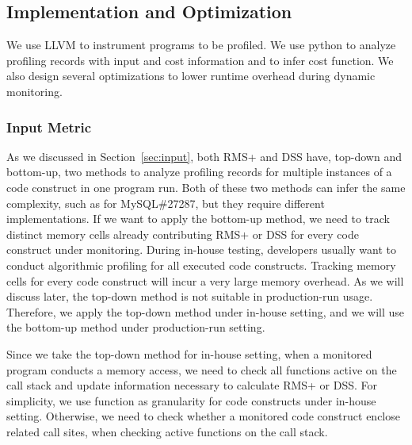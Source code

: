 \subsection{Implementation and Optimization}

We use LLVM\cite{llvm} to instrument programs to be profiled.
We use python to analyze profiling records 
with input and cost information and to infer cost function. 
We also design several optimizations to lower runtime overhead 
during dynamic monitoring.  


\subsubsection{Input Metric}
As we discussed in Section~\ref{sec:input},
both RMS+ and DSS have, top-down and bottom-up, 
two methods to analyze profiling records for multiple instances of 
a code construct in one program run. 
Both of these two methods can infer the same complexity, 
such as for MySQL\#27287,
but they require different implementations.
If we want to apply the bottom-up method,
we need to track distinct memory cells already contributing 
RMS+ or DSS for every code construct under monitoring.
During in-house testing, developers usually want to conduct algorithmic profiling 
for all executed code constructs. 
Tracking memory cells for every code construct will 
incur a very large memory overhead.  
As we will discuss later, the top-down method 
is not suitable in production-run usage. 
Therefore, we apply the top-down method under in-house setting, 
and we will use the bottom-up method under production-run setting. 

Since we take the top-down method for in-house setting,
when a monitored program conducts a memory access,
we need to check all functions active on the call stack and 
update information necessary to calculate RMS+ or DSS. 
For simplicity, we use function as granularity for code constructs under in-house setting.
Otherwise, we need to check whether a monitored code construct enclose related call sites, 
when checking active functions on the call stack.  

